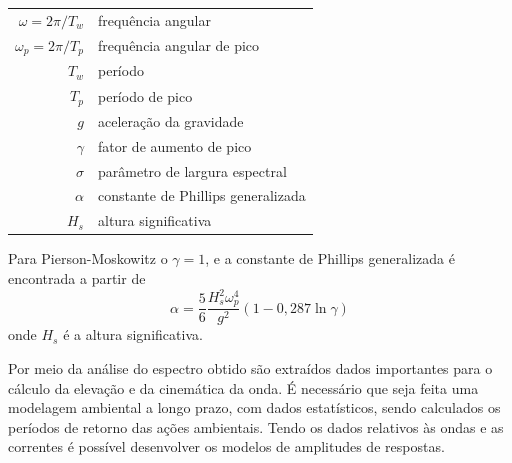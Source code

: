 \begin{tabular}{rl}
	$\omega = 2\pi/T_w$   & frequência angular\\
	$\omega_p = 2\pi/T_p$ & frequência angular de pico\\
	$T_w$                 & período\\
	$T_p$                 & período de pico\\
	$g$                   & aceleração da gravidade\\
	$\gamma$              & fator de aumento de pico\\
	$\sigma$              & parâmetro de largura espectral\\
	$\alpha$              & constante de Phillips generalizada\\
	$H_s$                 & altura significativa
\end{tabular}

Para Pierson-Moskowitz o $\gamma=1$, e a constante de Phillips generalizada é encontrada a partir de
\begin{equation}
\label{eq:viv-phillips}
\alpha = \frac{5}{6} \frac{H_s^2 \omega_p^4}{g^2} \left(1- 0,287 \ln{\gamma}\right)
\end{equation}
onde $H_s$ é a altura significativa.

Por meio da análise do espectro obtido são extraídos dados importantes para o cálculo da elevação e da cinemática da onda.
É necessário que seja feita uma modelagem ambiental a longo prazo, com dados estatísticos, sendo calculados os períodos de retorno das ações ambientais.
Tendo os dados relativos às ondas e as correntes é possível desenvolver os modelos de amplitudes de respostas.
